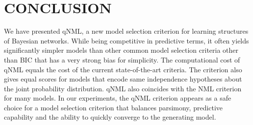 \section{CONCLUSION}

We have presented qNML, a new model selection criterion for learning
structures of Bayesian networks.  While being competitive in
predictive terms, it often yields significantly simpler models than
other common model selection criteria other than BIC that has a very strong
bias for simplicity. The computational cost of qNML
equals the cost of the current state-of-the-art criteria. The
criterion also gives equal scores for models that encode same
independence hypotheses about the joint probability distribution.
qNML also coincides with the NML criterion for many models.
In our experiments, the qNML criterion appears as a safe choice for a
model selection criterion that balances
parsimony, predictive capability and the ability to quickly converge to the
generating model.
